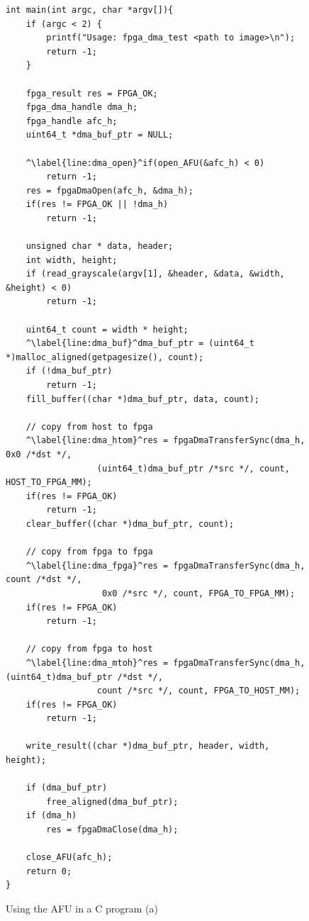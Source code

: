 \documentclass[epsfig,10pt,fullpage]{article}
\begin{document}
\lstset{language=C,numbers=left,escapechar=\^}
\begin{figure}
\begin{center}
\begin{minipage}[h]{17 cm}
\begin{lstlisting}[name=C_code]
int main(int argc, char *argv[]){
	if (argc < 2) {
		printf("Usage: fpga_dma_test <path to image>\n");
		return -1;
	}
	
	fpga_result res = FPGA_OK;
	fpga_dma_handle dma_h;
	fpga_handle afc_h;
	uint64_t *dma_buf_ptr = NULL;

	^\label{line:dma_open}^if(open_AFU(&afc_h) < 0)
		return -1;
	res = fpgaDmaOpen(afc_h, &dma_h);
	if(res != FPGA_OK || !dma_h)
		return -1;

	unsigned char * data, header;
	int width, height;
	if (read_grayscale(argv[1], &header, &data, &width, &height) < 0) 
		return -1;
	
	uint64_t count = width * height;
	^\label{line:dma_buf}^dma_buf_ptr = (uint64_t *)malloc_aligned(getpagesize(), count);
	if (!dma_buf_ptr)
		return -1;
	fill_buffer((char *)dma_buf_ptr, data, count);

	// copy from host to fpga
	^\label{line:dma_htom}^res = fpgaDmaTransferSync(dma_h, 0x0 /*dst */,
				  (uint64_t)dma_buf_ptr /*src */, count, HOST_TO_FPGA_MM);
	if(res != FPGA_OK)
		return -1;
	clear_buffer((char *)dma_buf_ptr, count);
	
	// copy from fpga to fpga
	^\label{line:dma_fpga}^res = fpgaDmaTransferSync(dma_h, count /*dst */, 
	               0x0 /*src */, count, FPGA_TO_FPGA_MM);
	if(res != FPGA_OK)
		return -1;

	// copy from fpga to host
	^\label{line:dma_mtoh}^res = fpgaDmaTransferSync(dma_h, (uint64_t)dma_buf_ptr /*dst */,
				  count /*src */, count, FPGA_TO_HOST_MM);
	if(res != FPGA_OK)
		return -1;

	write_result((char *)dma_buf_ptr, header, width, height);

	if (dma_buf_ptr)
		free_aligned(dma_buf_ptr);
	if (dma_h)
		res = fpgaDmaClose(dma_h);

	close_AFU(afc_h);
	return 0;
}
\end{lstlisting}
\end{minipage}
\caption{Using the AFU in a C program (a)}
\label{fig:C_code}
\end{center}
\end{figure}
\end{document}
